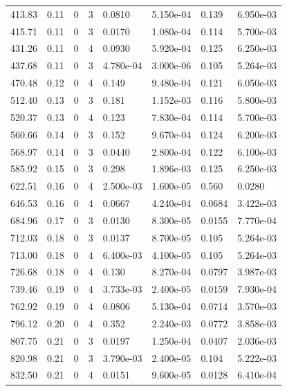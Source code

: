 \documentclass[preview]{standalone}
\begin{document}
{{{\begin{tabular}{L{1.2cm}C{1.2cm} C{0.3cm}C{0.5cm} C{1.4cm}C{1.4cm} C{1.4cm}C{1.4cm}}
  413.83  &  0.11  & 0     &  3 &  0.0810  & 5.150e-04  & 0.139 &  6.950e-03   \\ 
  415.71  &  0.11  & 0     &  3 &  0.0170  & 1.080e-04  & 0.114 &  5.700e-03   \\ 
  431.26  &  0.11  & 0     &  4 &  0.0930  & 5.920e-04  & 0.125 &  6.250e-03   \\ 
  437.68  &  0.11  & 0     &  3 &  4.780e-04  & 3.000e-06  & 0.105 &  5.264e-03   \\ 
  470.48  &  0.12  & 0     &  4 &  0.149  & 9.480e-04  & 0.121 &  6.050e-03   \\ 
  512.40  &  0.13  & 0     &  3 &  0.181  & 1.152e-03  & 0.116 &  5.800e-03   \\ 
  520.37  &  0.13  & 0     &  4 &  0.123  & 7.830e-04  & 0.114 &  5.700e-03   \\ 
  560.66  &  0.14  & 0     &  3 &  0.152  & 9.670e-04  & 0.124 &  6.200e-03   \\ 
  568.97  &  0.14  & 0     &  3 &  0.0440  & 2.800e-04  & 0.122 &  6.100e-03   \\ 
  585.92  &  0.15  & 0     &  3 &  0.298  & 1.896e-03  & 0.125 &  6.250e-03   \\ 
  622.51  &  0.16  & 0     &  4 &  2.500e-03  & 1.600e-05  & 0.560 &  0.0280   \\ 
  646.53  &  0.16  & 0     &  4 &  0.0667  & 4.240e-04  & 0.0684 &  3.422e-03   \\ 
  684.96  &  0.17  & 0     &  3 &  0.0130  & 8.300e-05  & 0.0155 &  7.770e-04   \\ 
  712.03  &  0.18  & 0     &  3 &  0.0137  & 8.700e-05  & 0.105 &  5.264e-03   \\ 
  713.00  &  0.18  & 0     &  4 &  6.400e-03  & 4.100e-05  & 0.105 &  5.264e-03   \\ 
  726.68  &  0.18  & 0     &  4 &  0.130  & 8.270e-04  & 0.0797 &  3.987e-03   \\ 
  739.46  &  0.19  & 0     &  4 &  3.733e-03  & 2.400e-05  & 0.0159 &  7.930e-04   \\ 
  762.92  &  0.19  & 0     &  4 &  0.0806  & 5.130e-04  & 0.0714 &  3.570e-03   \\ 
  796.12  &  0.20  & 0     &  4 &  0.352  & 2.240e-03  & 0.0772 &  3.858e-03   \\ 
  807.75  &  0.21  & 0     &  3 &  0.0197  & 1.250e-04  & 0.0407 &  2.036e-03   \\ 
  820.98  &  0.21  & 0     &  3 &  3.790e-03  & 2.400e-05  & 0.104 &  5.222e-03   \\ 
  832.50  &  0.21  & 0     &  4 &  0.0151  & 9.600e-05  & 0.0128 &  6.410e-04   \\ 

\end{tabular}}}}
\end{document}
